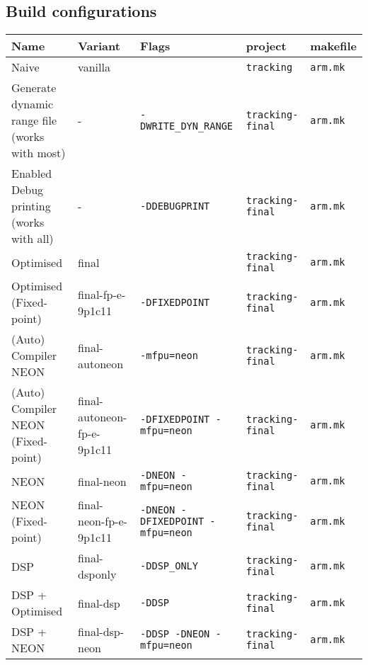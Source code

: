 \documentclass[final]{article} %
\begin{document}
\begin{appendices}
\section{Build configurations}
\begin{table}[H]
	\centering
	\begin{tabular}{>{\raggedright}p{2.5cm}l>{\raggedright}p{3cm}ll}
	\toprule
	\textbf{Name}									& \textbf{Variant}				& \textbf{Flags}							& \textbf{project}			& \textbf{makefile}	\\
	\midrule
	Naive											& vanilla 						& \texttt{}									& \texttt{tracking}			& \texttt{arm.mk}	\\
	Generate dynamic range file	(works with most)	& - 							& \texttt{-DWRITE\_DYN\_RANGE}				& \texttt{tracking-final}	& \texttt{arm.mk}	\\
	Enabled Debug printing	(works with all)    	& - 							& \texttt{-DDEBUGPRINT}						& \texttt{tracking-final}	& \texttt{arm.mk}	\\
	Optimised										& final 						& \texttt{}									& \texttt{tracking-final}	& \texttt{arm.mk}	\\
	Optimised (Fixed-point)							& final-fp-e-9p1c11				& \texttt{-DFIXEDPOINT}	    				& \texttt{tracking-final}	& \texttt{arm.mk}	\\
	(Auto) Compiler NEON							& final-autoneon 				& \texttt{-mfpu=neon}		    			& \texttt{tracking-final}	& \texttt{arm.mk}	\\
	(Auto) Compiler NEON (Fixed-point)				& final-autoneon-fp-e-9p1c11	& \texttt{-DFIXEDPOINT -mfpu=neon}		    & \texttt{tracking-final}	& \texttt{arm.mk}	\\
	NEON											& final-neon 					& \texttt{-DNEON -mfpu=neon}		    	& \texttt{tracking-final}	& \texttt{arm.mk}	\\
	NEON (Fixed-point)								& final-neon-fp-e-9p1c11		& \texttt{-DNEON -DFIXEDPOINT -mfpu=neon}	& \texttt{tracking-final}	& \texttt{arm.mk}	\\
	DSP												& final-dsponly					& \texttt{-DDSP\_ONLY}						& \texttt{tracking-final}	& \texttt{arm.mk}	\\
	DSP + Optimised									& final-dsp 					& \texttt{-DDSP}							& \texttt{tracking-final}	& \texttt{arm.mk}	\\
	DSP + NEON										& final-dsp-neon 				& \texttt{-DDSP -DNEON -mfpu=neon}			& \texttt{tracking-final}	& \texttt{arm.mk}	\\
	\bottomrule
	\end{tabular}
\end{table}


\end{appendices}
\end{document}
